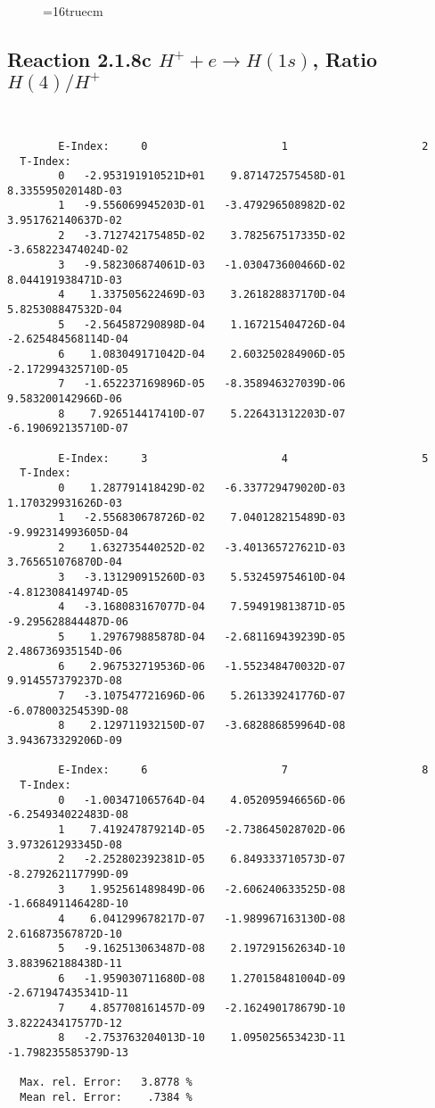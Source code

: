 \documentclass[12pt,dvipdfmx]{article}
\begin{document}
\begin{figure} \label{2.1.8rb}
\epsfxsize=16truecm
\end{figure}
\newpage



\subsection{
Reaction 2.1.8c  $H^+ + e \rightarrow H(1s) $,  Ratio $H(4)/H^+$
}

\begin{small}\begin{verbatim}


        E-Index:     0                     1                     2
  T-Index:
        0   -2.953191910521D+01    9.871472575458D-01    8.335595020148D-03
        1   -9.556069945203D-01   -3.479296508982D-02    3.951762140637D-02
        2   -3.712742175485D-02    3.782567517335D-02   -3.658223474024D-02
        3   -9.582306874061D-03   -1.030473600466D-02    8.044191938471D-03
        4    1.337505622469D-03    3.261828837170D-04    5.825308847532D-04
        5   -2.564587290898D-04    1.167215404726D-04   -2.625484568114D-04
        6    1.083049171042D-04    2.603250284906D-05   -2.172994325710D-05
        7   -1.652237169896D-05   -8.358946327039D-06    9.583200142966D-06
        8    7.926514417410D-07    5.226431312203D-07   -6.190692135710D-07

        E-Index:     3                     4                     5
  T-Index:
        0    1.287791418429D-02   -6.337729479020D-03    1.170329931626D-03
        1   -2.556830678726D-02    7.040128215489D-03   -9.992314993605D-04
        2    1.632735440252D-02   -3.401365727621D-03    3.765651076870D-04
        3   -3.131290915260D-03    5.532459754610D-04   -4.812308414974D-05
        4   -3.168083167077D-04    7.594919813871D-05   -9.295628844487D-06
        5    1.297679885878D-04   -2.681169439239D-05    2.486736935154D-06
        6    2.967532719536D-06   -1.552348470032D-07    9.914557379237D-08
        7   -3.107547721696D-06    5.261339241776D-07   -6.078003254539D-08
        8    2.129711932150D-07   -3.682886859964D-08    3.943673329206D-09

        E-Index:     6                     7                     8
  T-Index:
        0   -1.003471065764D-04    4.052095946656D-06   -6.254934022483D-08
        1    7.419247879214D-05   -2.738645028702D-06    3.973261293345D-08
        2   -2.252802392381D-05    6.849333710573D-07   -8.279262117799D-09
        3    1.952561489849D-06   -2.606240633525D-08   -1.668491146428D-10
        4    6.041299678217D-07   -1.989967163130D-08    2.616873567872D-10
        5   -9.162513063487D-08    2.197291562634D-10    3.883962188438D-11
        6   -1.959030711680D-08    1.270158481004D-09   -2.671947435341D-11
        7    4.857708161457D-09   -2.162490178679D-10    3.822243417577D-12
        8   -2.753763204013D-10    1.095025653423D-11   -1.798235585379D-13

  Max. rel. Error:   3.8778 %
  Mean rel. Error:    .7384 %


\end{verbatim}\end{small}
\end{document}

